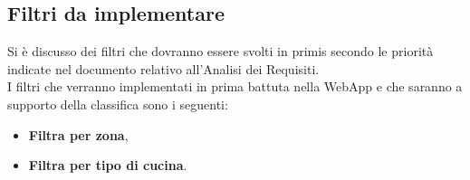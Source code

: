 \subsection{Filtri da implementare}
Si è discusso dei filtri che dovranno essere svolti in primis secondo le priorità indicate nel documento relativo all'Analisi dei Requisiti. \\
I filtri che verranno implementati in prima battuta nella WebApp e che saranno a supporto della classifica sono i seguenti:
\begin{itemize}
	\item{\textbf{Filtra per zona},}
	\item{\textbf{Filtra per tipo di cucina}.}
\end{itemize}

